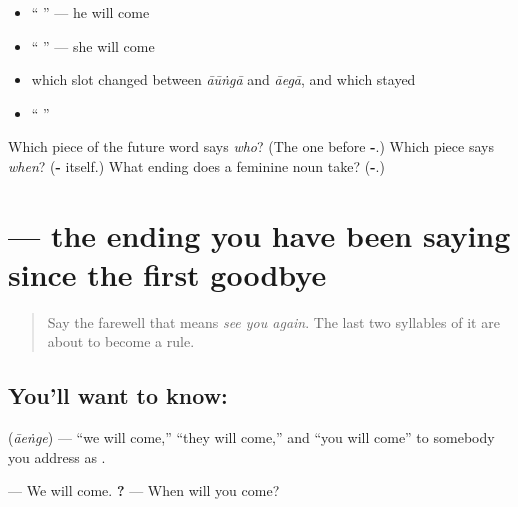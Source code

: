 \begin{itemize}
\raggedright
  \item \textquotedblleft{} \textquotedblright{} — he will come
  \item \textquotedblleft{} \textquotedblright{} — she will come
  \item which slot changed between \emph{āūṅgā} and \emph{āegā}, and which stayed
  \item \textquotedblleft{} \textquotedblright{}
\end{itemize}

\begin{tcolorbox}[breakable,colback=teal!4,colframe=teal!35!black,title={Before you move on}]
Which piece of the future word says \emph{who}? (The one before \textbf{-}.) Which piece says \emph{when}? (\textbf{-} itself.) What ending does a feminine noun take? (\textbf{-}.)
\end{tcolorbox}
\section[\texorpdfstring{\hi{आएँगे} (āeṅge)}{आएँगे (āeṅge)}]{ — the ending you have been saying since the first goodbye}

\label{lesson:HI-C88-aaenge}



\begin{quote}
Say the farewell that means \emph{see you again}. The last two syllables of it are about to become a rule.
\end{quote}

\subsection*{You'll want to know: }
\textbf{} (\emph{āeṅge}) — \textquotedblleft{}we will come,\textquotedblright{} \textquotedblleft{}they will come,\textquotedblright{} and \textquotedblleft{}you will come\textquotedblright{} to somebody you address as \textbf{}.

\textbf{ } — We will come. \textbf{  ?} — When will you come?

